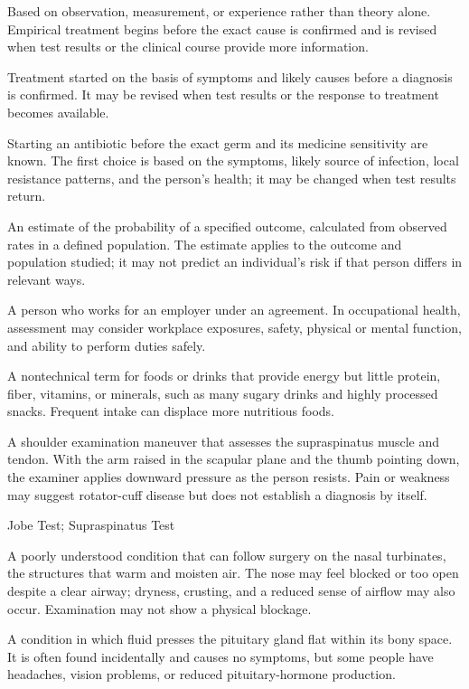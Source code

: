 Based on observation, measurement, or experience rather than theory alone. Empirical treatment begins before the exact cause is confirmed and is revised when test results or the clinical course provide more information.

 Treatment started on the basis of symptoms and likely causes before a diagnosis is confirmed. It may be revised when test results or the response to treatment becomes available.

 Starting an antibiotic before the exact germ and its medicine sensitivity are known. The first choice is based on the symptoms, likely source of infection, local resistance patterns, and the person’s health; it may be changed when test results return.

 An estimate of the probability of a specified outcome, calculated from observed rates in a defined population. The estimate applies to the outcome and population studied; it may not predict an individual’s risk if that person differs in relevant ways.

 A person who works for an employer under an agreement. In occupational health, assessment may consider workplace exposures, safety, physical or mental function, and ability to perform duties safely.

 A nontechnical term for foods or drinks that provide energy but little protein, fiber, vitamins, or minerals, such as many sugary drinks and highly processed snacks. Frequent intake can displace more nutritious foods.

 A shoulder examination maneuver that assesses the supraspinatus muscle and tendon. With the arm raised in the scapular plane and the thumb pointing down, the examiner applies downward pressure as the person resists. Pain or weakness may suggest rotator-cuff disease but does not establish a diagnosis by itself.

\synonyms
Jobe Test; Supraspinatus Test

 A poorly understood condition that can follow surgery on the nasal turbinates, the structures that warm and moisten air. The nose may feel blocked or too open despite a clear airway; dryness, crusting, and a reduced sense of airflow may also occur. Examination may not show a physical blockage.

 A condition in which fluid presses the pituitary gland flat within its bony space. It is often found incidentally and causes no symptoms, but some people have headaches, vision problems, or reduced pituitary-hormone production.


